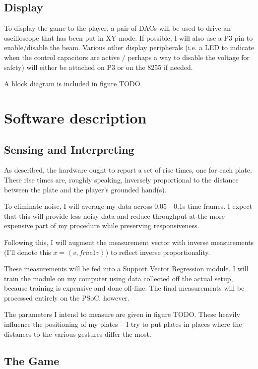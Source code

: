 \subsection{Display}

To display the game to the player, a pair of DACs will be used to drive an oscilloscope that has been put in XY-mode. If possible, I will also use a P3 pin to enable/disable the beam. Various other display peripherals (i.e. a LED to indicate when the control capacitors are active / perhaps a way to disable the voltage for safety) will either be attached on P3 or on the 8255 if needed.

A block diagram is included in figure TODO.

\section{Software description}

\subsection{Sensing and Interpreting}

As described, the hardware ought to report a set of rise times, one for each plate. These rise times are, roughly speaking, inversely proportional to the distance between the plate and the player's grounded hand(s).

To eliminate noise, I will average my data across 0.05 - 0.1s time frames. I expect that this will provide less noisy data and reduce throughput at the more expensive part of my procedure while preserving responsiveness.

Following this, I will augment the measurement vector with inverse measurements (I'll denote this $x = \left< v, frac{1}{v} \right>$) to reflect inverse proportionality.

These measurements will be fed into a Support Vector Regression module. I will train the module on my computer using data collected off the actual setup, because training is expensive and done off-line. The final measurements will be processed entirely on the PSoC, however.

The parameters I intend to measure are given in figure TODO. These heavily influence the positioning of my plates -- I try to put plates in places where the distances to the various gestures differ the most.

\subsection{The Game}

